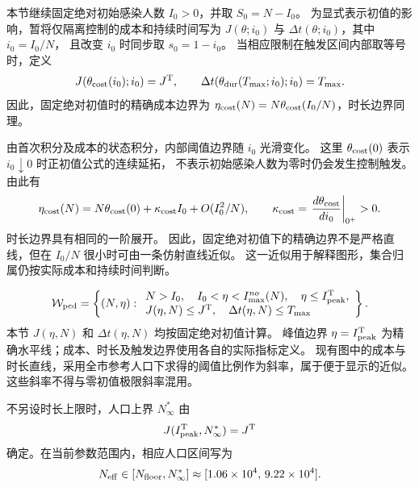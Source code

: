 
本节继续固定绝对初始感染人数 $I_0>0$，并取 $S_0=N-I_0$。
为显式表示初值的影响，暂将仅隔离控制的成本和持续时间写为
$J(\theta;i_0)$ 与 $\Delta t(\theta;i_0)$，其中 $i_0=I_0/N$，
且改变 $i_0$ 时同步取 $s_0=1-i_0$。
当相应限制在触发区间内部取等号时，定义
\[
 J(\theta_{\rm cost}(i_0);i_0)=J^{\rm T},\qquad
 \Delta t(\theta_{\rm dur}(T_{\max};i_0);i_0)=T_{\max}.
\]
因此，固定绝对初值时的精确成本边界为
$\eta_{\rm cost}(N)=N\theta_{\rm cost}(I_0/N)$，时长边界同理。

由首次积分及成本的状态积分，内部阈值边界随 $i_0$ 光滑变化。
这里 $\theta_{\rm cost}(0)$ 表示 $i_0\downarrow0$ 时正初值公式的连续延拓，
不表示初始感染人数为零时仍会发生控制触发。由此有
\[
\eta_{\rm cost}(N)
=N\theta_{\rm cost}(0)+\kappa_{\rm cost}I_0
+O(I_0^2/N),\qquad
\kappa_{\rm cost}
=\left.\frac{d\theta_{\rm cost}}{di_0}\right|_{0^+}>0.
\]
时长边界具有相同的一阶展开。
因此，固定绝对初值下的精确边界不是严格直线，但在 $I_0/N$ 很小时可由一条仿射直线近似。
这一近似用于解释图形，集合归属仍按实际成本和持续时间判断。

\[
\mathcal W_{\rm pcd}
=\left\{(N,\eta):
\begin{array}{l}
N>I_0,\quad I_0<\eta<I_{\max}^{no}(N),\quad
\eta\le I_{\rm peak}^{\rm T},\\
J(\eta,N)\le J^{\rm T},\quad
\Delta t(\eta,N)\le T_{\max}
\end{array}\right\}.
\]
本节 $J(\eta,N)$ 和 $\Delta t(\eta,N)$ 均按固定绝对初值计算。
峰值边界 $\eta=I_{\rm peak}^{\rm T}$ 为精确水平线；成本、时长及触发边界使用各自的实际指标定义。
现有图中的成本与时长直线，采用全市参考人口下求得的阈值比例作为斜率，属于便于显示的近似。
这些斜率不得与零初值极限斜率混用。

不另设时长上限时，人口上界 $N^*_{\infty}$ 由
\[
J(I_{\rm peak}^{\rm T},N^*_{\infty})=J^{\rm T}
\]
确定。在当前参数范围内，相应人口区间写为
\[
N_{\rm eff}\in[N_{\rm floor},N^*_{\infty}]
\approx[1.06\times10^4,\,9.22\times10^4].
\]

